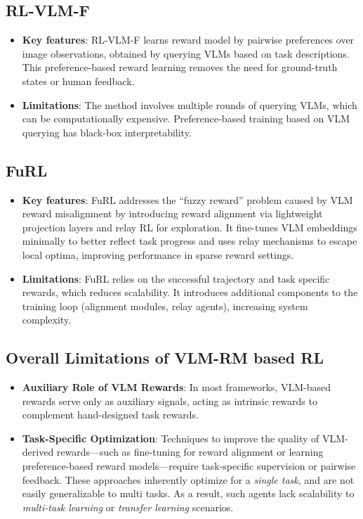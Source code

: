 \documentclass[11pt]{article}
\begin{document}
\subsection{RL-VLM-F}
\begin{itemize}
    \item \textbf{Key features}: RL-VLM-F \cite{rlvlmf} learns reward model by pairwise preferences over image observations, obtained by querying VLMs based on task descriptions. This preference-based reward learning removes the need for ground-truth states or human feedback.

    \item \textbf{Limitations}: The method involves multiple rounds of querying VLMs, which can be computationally expensive. Preference-based training based on VLM querying has black-box interpretability.
\end{itemize}

\subsection{FuRL}
\begin{itemize}
    \item \textbf{Key features}: FuRL \cite{furl} addresses the “fuzzy reward” problem caused by VLM reward misalignment by introducing reward alignment via lightweight projection layers and relay RL for exploration. It fine-tunes VLM embeddings minimally to better reflect task progress and uses relay mechanisms to escape local optima, improving performance in sparse reward settings.

    \item \textbf{Limitations}: FuRL relies on the successful trajectory and task specific rewards, which reduces scalability. It introduces additional components to the training loop (alignment modules, relay agents), increasing system complexity.
\end{itemize}

\subsection{Overall Limitations of VLM-RM based RL}
\begin{itemize}
    \item \textbf{Auxiliary Role of VLM Rewards}: In most frameworks, VLM-based rewards serve only as auxiliary signals, acting as intrinsic rewards to complement hand-designed task rewards.

    \item \textbf{Task-Specific Optimization}: Techniques to improve the quality of VLM-derived rewards—such as fine-tuning for reward alignment or learning preference-based reward models—require task-specific supervision or pairwise feedback. These approaches inherently optimize for a \emph{single task}, and are not easily generalizable to multi tasks. As a result, such agents lack scalability to \emph{multi-task learning} or \emph{transfer learning} scenarios.
\end{itemize}
\end{document}
